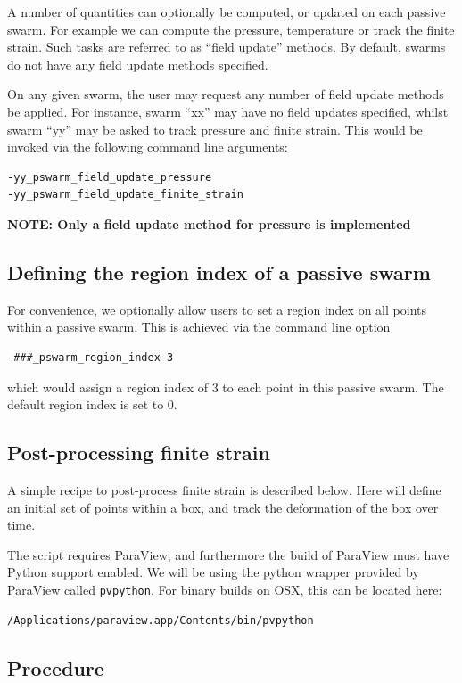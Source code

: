 \documentclass[paper=a4, fontsize=11pt,twoside]{scrartcl}
\begin{document}
{{A number of quantities can optionally be computed, or updated on each passive swarm. 
For example we can compute the pressure, temperature or track the finite strain. 
Such tasks are referred to as ``field update'' methods. By default, swarms do not have
any field update methods specified.

On any given swarm, the user may request any number of field update methods be applied. 
For instance, swarm ``xx'' may have no field updates specified, whilst swarm ``yy'' may be
asked to track pressure and finite strain. This would be invoked via the following command
line arguments:
\begin{lstlisting}
-yy_pswarm_field_update_pressure
-yy_pswarm_field_update_finite_strain
\end{lstlisting}

\textbf{NOTE: Only a field update method for pressure is implemented}

\subsection{Defining the region index of a passive swarm}

For convenience, we optionally allow users to set a region index on all points within a passive swarm.
This is achieved via the command line option
\begin{lstlisting} 
-###_pswarm_region_index 3
\end{lstlisting}
which would assign a region index of 3 to each point in this passive swarm. 
The default region index is set to 0.

\subsection{Post-processing finite strain}
A simple recipe to post-process finite strain is described below.
Here will define an initial set of points within a box, and track the deformation of the box over time.

The script requires ParaView, and furthermore the build of ParaView must have Python support enabled.
We will be using the python wrapper provided by ParaView called {\tt pvpython}.
For binary builds on OSX, this can be located here:
\begin{lstlisting}
/Applications/paraview.app/Contents/bin/pvpython
\end{lstlisting}

\subsection{Procedure}
\begin{enumerate}


\end{enumerate}}}
\end{document}
